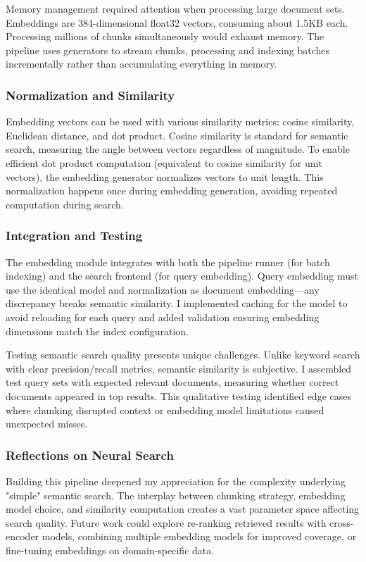 \documentclass[12pt, a4paper]{article}
\begin{document}
Memory management required attention when processing large document sets. Embeddings are 384-dimensional float32 vectors, consuming about 1.5KB each. Processing millions of chunks simultaneously would exhaust memory. The pipeline uses generators to stream chunks, processing and indexing batches incrementally rather than accumulating everything in memory.

\subsubsection*{Normalization and Similarity}

Embedding vectors can be used with various similarity metrics: cosine similarity, Euclidean distance, and dot product. Cosine similarity is standard for semantic search, measuring the angle between vectors regardless of magnitude. To enable efficient dot product computation (equivalent to cosine similarity for unit vectors), the embedding generator normalizes vectors to unit length. This normalization happens once during embedding generation, avoiding repeated computation during search.

\subsubsection*{Integration and Testing}

The embedding module integrates with both the pipeline runner (for batch indexing) and the search frontend (for query embedding). Query embedding must use the identical model and normalization as document embedding—any discrepancy breaks semantic similarity. I implemented caching for the model to avoid reloading for each query and added validation ensuring embedding dimensions match the index configuration.

Testing semantic search quality presents unique challenges. Unlike keyword search with clear precision/recall metrics, semantic similarity is subjective. I assembled test query sets with expected relevant documents, measuring whether correct documents appeared in top results. This qualitative testing identified edge cases where chunking disrupted context or embedding model limitations caused unexpected misses.

\subsubsection*{Reflections on Neural Search}

Building this pipeline deepened my appreciation for the complexity underlying "simple" semantic search. The interplay between chunking strategy, embedding model choice, and similarity computation creates a vast parameter space affecting search quality. Future work could explore re-ranking retrieved results with cross-encoder models, combining multiple embedding models for improved coverage, or fine-tuning embeddings on domain-specific data.
\end{document}
